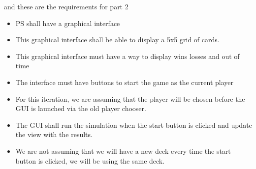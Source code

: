 \documentclass[12pt]{article}
\begin{document}
\par and these are the requirements for part 2

\begin{itemize}
    \item PS shall have a graphical interface
    \item This graphical interface shall be able to display a 5x5 grid of cards.
    \item This graphical interface must have a way to display wins losses and out of time
    \item The interface must have buttons to start the game as the current player
    \item For this iteration, we are assuming that the player will be chosen before the GUI is launched via the old player chooser.
    \item The GUI shall run the simulation when the start button is clicked and update the view with the results.
    \item We are not assuming that we will have a new deck every time the start button is clicked, we will be using the same deck.
\end{itemize}
\end{document}
